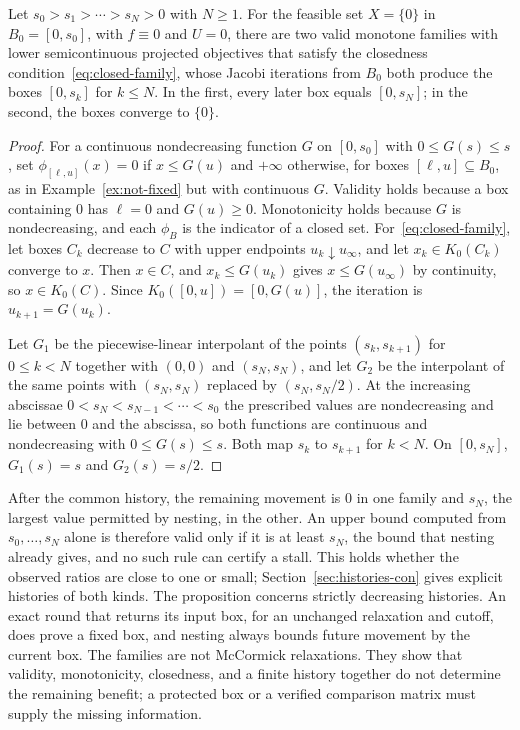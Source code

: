 \begin{proposition}\label{prop:history}
Let $s_0>s_1>\cdots>s_N>0$ with $N\ge1$. For the feasible set $X=\{0\}$
in $B_0=[0,s_0]$, with $f\equiv0$ and $U=0$, there are two valid monotone
families with lower semicontinuous projected objectives that satisfy the
closedness condition~\eqref{eq:closed-family}, whose Jacobi iterations
from $B_0$ both produce the boxes $[0,s_k]$ for $k\le N$. In the first,
every later box equals $[0,s_N]$; in the second, the boxes converge to
$\{0\}$.
\end{proposition}
\begin{proof}
For a continuous nondecreasing function $G$ on $[0,s_0]$ with
$0\le G(s)\le s$, set $\phi_{[\ell,u]}(x)=0$ if $x\le G(u)$ and $+\infty$
otherwise, for boxes $[\ell,u]\subseteq B_0$, as in
Example~\ref{ex:not-fixed} but with continuous $G$. Validity holds
because a box containing $0$ has $\ell=0$ and $G(u)\ge0$. Monotonicity
holds because $G$ is nondecreasing, and each $\phi_B$ is the indicator of
a closed set. For~\eqref{eq:closed-family}, let boxes $C_k$ decrease to
$C$ with upper endpoints $u_k\downarrow u_\infty$, and let
$x_k\in K_0(C_k)$ converge to $x$. Then $x\in C$, and $x_k\le G(u_k)$
gives $x\le G(u_\infty)$ by continuity, so $x\in K_0(C)$. Since
$K_0([0,u])=[0,G(u)]$, the iteration is $u_{k+1}=G(u_k)$.

Let $G_1$ be the piecewise-linear interpolant of the points $(s_k,s_{k+1})$
for $0\le k<N$ together with $(0,0)$ and $(s_N,s_N)$, and let $G_2$ be the
interpolant of the same points with $(s_N,s_N)$ replaced by
$(s_N,s_N/2)$. At the increasing abscissae $0<s_N<s_{N-1}<\cdots<s_0$ the
prescribed values are nondecreasing and lie between $0$ and the abscissa,
so both functions are continuous and nondecreasing with $0\le G(s)\le s$.
Both map $s_k$ to $s_{k+1}$ for $k<N$. On $[0,s_N]$, $G_1(s)=s$ and
$G_2(s)=s/2$.
\end{proof}

After the common history, the remaining movement is $0$ in one family and
$s_N$, the largest value permitted by nesting, in the other. An upper
bound computed from $s_0,\ldots,s_N$ alone is therefore valid only if it
is at least $s_N$, the bound that nesting already gives, and no such rule
can certify a stall. This holds whether the observed ratios are close to
one or small; Section~\ref{sec:histories-con} gives explicit histories of
both kinds. The proposition concerns strictly decreasing histories. An
exact round that returns its input box, for an unchanged relaxation and
cutoff, does prove a fixed box, and nesting always bounds future movement
by the current box. The families are not McCormick relaxations. They show
that validity, monotonicity, closedness, and a finite history together do
not determine the remaining benefit; a protected box or a verified
comparison matrix must supply the missing information.

